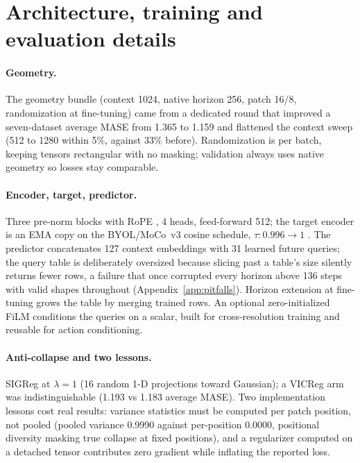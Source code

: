 \section{Architecture, training and evaluation details}
\label{app:training}

\paragraph{Geometry.}
The geometry bundle (context 1024, native horizon 256, patch 16/8,
randomization at fine-tuning) came from a dedicated round that improved a
seven-dataset average MASE from 1.365 to 1.159 and flattened the context
sweep (512 to 1280 within 5\%, against 33\% before). Randomization is per
batch, keeping tensors rectangular with no masking; validation always
uses native geometry so losses stay comparable.

\paragraph{Encoder, target, predictor.}
Three pre-norm blocks \citep{xiong2020preln} with RoPE \citep{su2024rope},
4 heads, feed-forward 512; the target encoder is an EMA copy on the
BYOL/MoCo~v3 cosine schedule, $\tau: 0.996 \to 1$
\citep{grill2020byol,chen2021mocov3}. The predictor concatenates 127
context embeddings with 31 learned future queries; the query table is
deliberately oversized because slicing past a table's size silently
returns fewer rows, a failure that once corrupted every horizon above 136
steps with valid shapes throughout (Appendix~\ref{app:pitfalls}).
Horizon extension at fine-tuning grows the table by merging trained rows.
An optional zero-initialized FiLM conditions the queries on a scalar,
built for cross-resolution training and reusable for action conditioning.

\paragraph{Anti-collapse and two lessons.}
SIGReg \citep{balestriero2025lejepa} at $\lambda{=}1$ (16 random 1-D
projections toward Gaussian); a VICReg arm was indistinguishable (1.193
vs 1.183 average MASE). Two implementation lessons cost real results:
variance statistics must be computed per patch position, not pooled
(pooled variance 0.9990 against per-position 0.0000, positional diversity
masking true collapse at fixed positions), and a regularizer computed on
a detached tensor contributes zero gradient while inflating the reported
loss.

